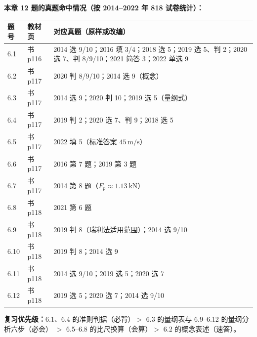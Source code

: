 \begin{tishi}
\textbf{本章 12 题的真题命中情况（按 2014--2022 年 818 试卷统计）：}\\
{\footnotesize
\begin{tabularx}{\textwidth}{@{}llX@{}}
\toprule
题号 & 教材页 & 对应真题（原样或改编） \\
\midrule
6.1 & 书 p116 & 2014 选 9/10；2016 填 3/4；2018 选 5；2019 选 5、判 2；2020 选 7、判 8/9/10；2021 简答 3；2022 单选 9 \\
6.2 & 书 p117 & 2020 判 8/9/10；2014 选 9（概念） \\
6.3 & 书 p117 & 2014 选 9；2020 判 10；2019 选 5（量纲式） \\
6.4 & 书 p117 & 2019 判 2；2020 选 7、判 9；2018 选 5 \\
6.5 & 书 p117 & 2022 填 5（标准答案 $45\ \mathrm{m/s}$） \\
6.6 & 书 p117 & 2016 第 7 题；2019 第 3 题 \\
6.7 & 书 p117 & 2014 第 8 题（$F_p\approx1.13\ \mathrm{kN}$） \\
6.8 & 书 p118 & 2021 第 6 题 \\
6.9 & 书 p118 & 2019 判 8（瑞利法适用范围）；2014 选 9/10 \\
6.10 & 书 p118 & 2019 判 8；2014 选 9 \\
6.11 & 书 p118 & 2014 选 9/10；2019 选 5；2020 选 7 \\
6.12 & 书 p118 & 2019 选 5；2020 选 7；2014 选 9/10 \\
\bottomrule
\end{tabularx}}
\textbf{复习优先级：}6.1、6.4 的准则判据（必背）$>$ 6.3 的量纲表与 6.9--6.12 的量纲分析六步（必会）
$>$ 6.5--6.8 的比尺换算（会算）$>$ 6.2 的概念表述（速答）。
\end{tishi}
